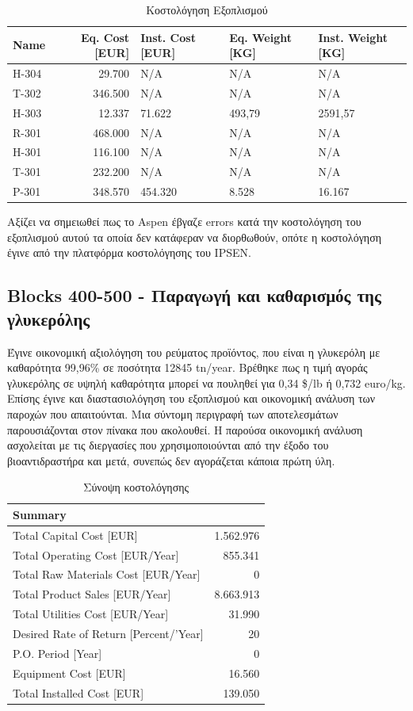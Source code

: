 \documentclass[11pt]{article}
\begin{document}
\begin{table}[htbp]
\caption{Κοστολόγηση Εξοπλισμού}
\centering
\begin{tabular}{lrlll}
Name & Eq. Cost [EUR] & Inst. Cost [EUR] & Eq. Weight [KG] & Inst. Weight [KG]\\
\hline
H-304 & 29.700 & N/A & N/A & N/A\\
T-302 & 346.500 & N/A & N/A & N/A\\
H-303 & 12.337 & 71.622 & 493,79 & 2591,57\\
R-301 & 468.000 & N/A & N/A & N/A\\
H-301 & 116.100 & N/A & N/A & N/A\\
T-301 & 232.200 & N/A & N/A & N/A\\
P-301 & 348.570 & 454.320 & 8.528 & 16.167\\
\end{tabular}
\end{table}

Αξίζει να σημειωθεί πως το Aspen έβγαζε errors κατά την κοστολόγηση του εξοπλισμού αυτού τα οποία δεν κατάφεραν να διορθωθούν, οπότε η κοστολόγηση έγινε από την πλατφόρμα κοστολόγησης του IPSEN.

\subsection{Blocks 400-500 - Παραγωγή και καθαρισμός της γλυκερόλης}
\label{sec:orge70af01}
Έγινε οικονομική αξιολόγηση του ρεύματος προϊόντος, που είναι η
γλυκερόλη με καθαρότητα 99,96\% σε ποσότητα 12845 tn/year. Βρέθηκε
πως η τιμή αγοράς γλυκερόλης σε υψηλή καθαρότητα μπορεί να πουληθεί
για 0,34 \$/lb ή 0,732 euro/kg. Επίσης έγινε και διαστασιολόγηση του
εξοπλισμού και οικονομική ανάλυση των παροχών που απαιτούνται. Μια
σύντομη περιγραφή των αποτελεσμάτων παρουσιάζονται στον πίνακα που
ακολουθεί. Η παρούσα οικονομική ανάλυση ασχολείται με τις διεργασίες που
χρησιμοποιούνται από την έξοδο του βιοαντιδραστήρα και μετά, συνεπώς δεν
αγοράζεται κάποια πρώτη ύλη.

\begin{table}[htbp]
\caption{Σύνοψη κοστολόγησης}
\centering
\begin{tabular}{lr}
Summary & \\
\hline
Total Capital Cost [EUR] & 1.562.976\\
Total Operating Cost [EUR/Year] & 855.341\\
Total Raw Materials Cost [EUR/Year] & 0\\
Total Product Sales [EUR/Year] & 8.663.913\\
Total Utilities Cost [EUR/Year] & 31.990\\
Desired Rate of Return [Percent/'Year] & 20\\
P.O. Period [Year] & 0\\
Equipment Cost [EUR] & 16.560\\
Total Installed Cost [EUR] & 139.050\\
\end{tabular}
\end{table}
\end{document}
